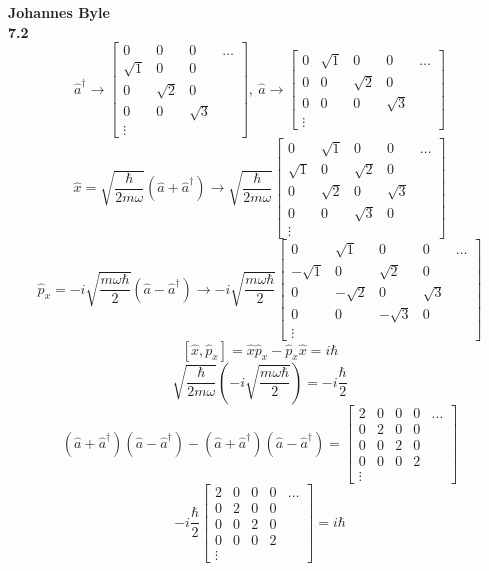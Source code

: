 \documentclass[english]{article}
\begin{document}
\textbf{Johannes Byle}\\
\noindent
\textbf{7.2}
\[
\hat{a}^{\dagger}\rightarrow
\begin{bmatrix}
0 & 0 & 0 & \dots\\
\sqrt{1} & 0 & 0\\
0 & \sqrt{2} & 0\\
0 & 0 & \sqrt{3}\\
\vdots
\end{bmatrix}
,\ 
\hat{a}\rightarrow
\begin{bmatrix}
0 & \sqrt{1} & 0 & 0 &\dots\\
0 & 0 & \sqrt{2} & 0\\
0 & 0 & 0 & \sqrt{3}\\
\vdots
\end{bmatrix}
\]
\[\hat{x}=\sqrt{\frac{\hbar}{2m\omega}}\left(\hat{a}+\hat{a}^{\dagger}\right)\rightarrow\sqrt{\frac{\hbar}{2m\omega}}
\begin{bmatrix}
0 & \sqrt{1} & 0 & 0 &\dots\\
\sqrt{1} & 0 & \sqrt{2} & 0\\
0 & \sqrt{2} & 0 & \sqrt{3}\\
0 & 0 & \sqrt{3} & 0\\
\vdots
\end{bmatrix}
\]
\[\hat{p}_x=-i\sqrt{\frac{m\omega\hbar}{2}}\left(\hat{a}-\hat{a}^{\dagger}\right)\rightarrow-i\sqrt{\frac{m\omega\hbar}{2}}
\begin{bmatrix}
0 & \sqrt{1} & 0 & 0 &\dots\\
-\sqrt{1} & 0 & \sqrt{2} & 0\\
0 & -\sqrt{2} & 0 & \sqrt{3}\\
0 & 0 & -\sqrt{3} & 0\\
\vdots
\end{bmatrix}
\]
$$\left[\hat{x},\hat{p}_x\right]=\hat{x}\hat{p}_x-\hat{p}_x\hat{x}=i\hbar$$
$$\sqrt{\frac{\hbar}{2m\omega}}\left(-i\sqrt{\frac{m\omega\hbar}{2}}\right)=-i\frac{\hbar}{2}$$
\[
\left(\hat{a}+\hat{a}^{\dagger}\right)\left(\hat{a}-\hat{a}^{\dagger}\right)-\left(\hat{a}+\hat{a}^{\dagger}\right)\left(\hat{a}-\hat{a}^{\dagger}\right)=
\begin{bmatrix}
2 & 0 & 0 & 0 &\dots\\
0 & 2 & 0 & 0\\
0 & 0 & 2 & 0\\
0 & 0 & 0 & 2\\
\vdots
\end{bmatrix}
\]
\[
-i\frac{\hbar}{2}
\begin{bmatrix}
2 & 0 & 0 & 0 &\dots\\
0 & 2 & 0 & 0\\
0 & 0 & 2 & 0\\
0 & 0 & 0 & 2\\
\vdots
\end{bmatrix}
=i\hbar
\]
\end{document}
